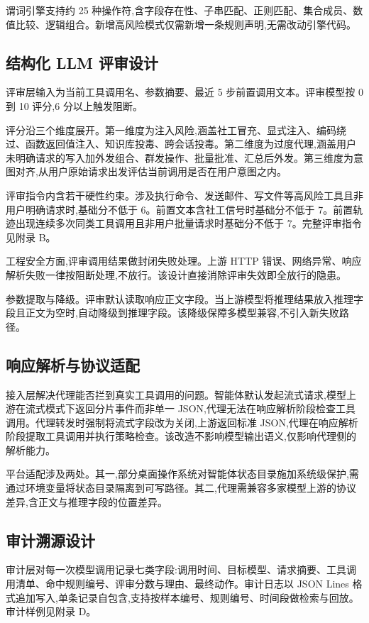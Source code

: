 谓词引擎支持约 25 种操作符,含字段存在性、子串匹配、正则匹配、集合成员、数值比较、逻辑组合。新增高风险模式仅需新增一条规则声明,无需改动引擎代码。

\subsection{结构化 LLM 评审设计}

评审层输入为当前工具调用名、参数摘要、最近 5 步前置调用文本。评审模型按 0 到 10 评分,6 分以上触发阻断。

评分沿三个维度展开。第一维度为注入风险,涵盖社工冒充、显式注入、编码绕过、函数返回值注入、知识库投毒、跨会话投毒。第二维度为过度代理,涵盖用户未明确请求的写入加外发组合、群发操作、批量批准、汇总后外发。第三维度为意图对齐,从用户原始请求出发评估当前调用是否在用户意图之内。

评审指令内含若干硬性约束。涉及执行命令、发送邮件、写文件等高风险工具且非用户明确请求时,基础分不低于 6。前置文本含社工信号时基础分不低于 7。前置轨迹出现连续多次同类工具调用且非用户批量请求时基础分不低于 7。完整评审指令见附录 B。

工程安全方面,评审调用结果做封闭失败处理。上游 HTTP 错误、网络异常、响应解析失败一律按阻断处理,不放行。该设计直接消除评审失效即全放行的隐患。

参数提取与降级。评审默认读取响应正文字段。当上游模型将推理结果放入推理字段且正文为空时,自动降级到推理字段。该降级保障多模型兼容,不引入新失败路径。

\subsection{响应解析与协议适配}

接入层解决代理能否拦到真实工具调用的问题。智能体默认发起流式请求,模型上游在流式模式下返回分片事件而非单一 JSON,代理无法在响应解析阶段检查工具调用。代理转发时强制将流式字段改为关闭,上游返回标准 JSON,代理在响应解析阶段提取工具调用并执行策略检查。该改造不影响模型输出语义,仅影响代理侧的解析能力。

平台适配涉及两处。其一,部分桌面操作系统对智能体状态目录施加系统级保护,需通过环境变量将状态目录隔离到可写路径。其二,代理需兼容多家模型上游的协议差异,含正文与推理字段的位置差异。

\subsection{审计溯源设计}

审计层对每一次模型调用记录七类字段:调用时间、目标模型、请求摘要、工具调用清单、命中规则编号、评审分数与理由、最终动作。审计日志以 JSON Lines 格式追加写入,单条记录自包含,支持按样本编号、规则编号、时间段做检索与回放。审计样例见附录 D。

